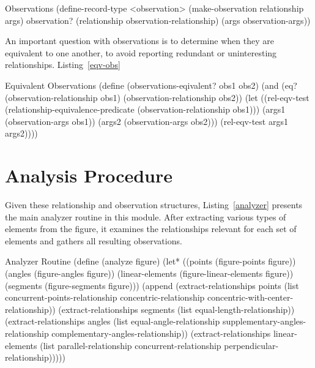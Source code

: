 \begin{code-listing}
[label=obs]
{Observations}
(define-record-type <observation>
  (make-observation relationship args)
  observation?
  (relationship observation-relationship)
  (args observation-args))
\end{code-listing}

An important question with observations is to determine when they
are equivalent to one another, to avoid reporting redundant or
uninteresting relationships. Listing~\ref{eqv-obs}

\begin{code-listing}
[label=eqv-obs]
{Equivalent Observations}
(define (observations-eqivalent? obs1 obs2)
  (and (eq? (observation-relationship obs1)
            (observation-relationship obs2))
       (let ((rel-eqv-test
              (relationship-equivalence-predicate
               (observation-relationship obs1)))
             (args1 (observation-args obs1))
             (args2 (observation-args obs2)))
         (rel-eqv-test args1 args2))))
\end{code-listing}

\section{Analysis Procedure}

Given these relationship and observation structures,
Listing~\ref{analyzer} presents the main analyzer routine in this
module. After extracting various types of elements from the figure, it
examines the relationships relevant for each set of elements and
gathers all resulting observations.

\begin{code-listing}
[label=analyzer]
{Analyzer Routine}
(define (analyze figure)
  (let* ((points (figure-points figure))
         (angles (figure-angles figure))
         (linear-elements (figure-linear-elements figure))
         (segments (figure-segments figure)))
    (append
     (extract-relationships points
                            (list concurrent-points-relationship
                                  concentric-relationship
                                  concentric-with-center-relationship))
     (extract-relationships segments
                             (list equal-length-relationship))
     (extract-relationships angles
                             (list equal-angle-relationship
                                   supplementary-angles-relationship
                                   complementary-angles-relationship))
     (extract-relationships linear-elements
                             (list parallel-relationship
                                   concurrent-relationship
                                   perpendicular-relationship)))))
\end{code-listing}

